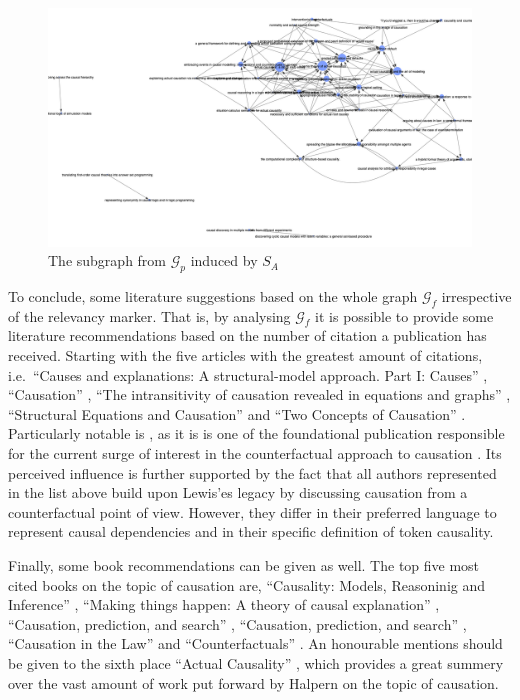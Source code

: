 \documentclass[11pt,a4paper]{book}
\theoremstyle{definition}
\theoremstyle{definition}
\theoremstyle{definition}
\theoremstyle{remark}
\newcommand{\prset}{S_{A}}
\newcommand{\tgraph}{\mathcal{G}_{f}}
\newcommand{\pgraph}{\mathcal{G}_{p}}
\begin{document}
\begin{figure}
\includegraphics[width=\textwidth]{important_pgraph.png}
\caption{The subgraph from $\pgraph$ induced by $\prset$}
\label{fig:pgraph-important}
\end{figure}




To conclude, some literature suggestions based on the whole graph $\tgraph$ irrespective of the relevancy marker. 
That is, by analysing $\tgraph$ it is possible to provide some literature recommendations based on the number of citation a publication has received. 
Starting with the five articles with the greatest amount of citations, i.e.\ 
``Causes and explanations: A structural-model approach. Part I: Causes'' \parencite{halpern2005causes}, 
``Causation'' \parencite{lewis1974causation},
``The intransitivity of causation revealed in equations and graphs'' \parencite{hitchcock2001intransitivity}, 
``Structural Equations and Causation'' \parencite{hall2007structural} and 
``Two Concepts of Causation'' \parencite{hall2004two}.
Particularly notable is \parencite{lewis1974causation}, as it is is one of the foundational publication responsible for the current surge of interest in the counterfactual approach to causation \parencite{beebee2009oxford}.
Its perceived influence is further supported by the fact that all authors represented in the list above build upon Lewis'es legacy by discussing causation from a counterfactual point of view. 
However, they differ in their preferred language to represent causal dependencies and in their specific definition of token causality. 


Finally, some book recommendations can be given as well. The top five most cited books on the topic of causation are, ``Causality: Models, Reasoninig and Inference'' \parencite{pearl2009causality}, ``Making things happen: A theory of causal explanation'' \parencite{woodward2005making},
``Causation, prediction, and search'' \parencite{spirtes2000causation}, ``Causation, prediction, and search'' \parencite{spirtes2000causation}, ``Causation in the Law'' \parencite{hart1985causation}  and ``Counterfactuals'' \parencite{lewis2013counterfactuals}. An honourable mentions should be given to the sixth place ``Actual Causality'' \parencite{halpern2016actual}, which provides a great summery over the vast amount of work put forward by Halpern
on the topic of causation.
\end{document}
